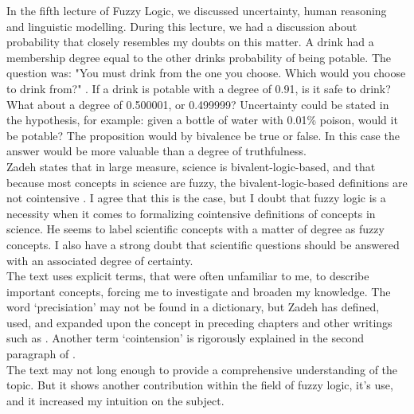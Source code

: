 In the fifth lecture of Fuzzy Logic, we discussed uncertainty, human reasoning and linguistic modelling. During this lecture, we had a discussion about probability that closely resembles my doubts on this matter. A drink had a membership degree equal to the other drinks probability of being potable. The question was: "You must drink from the one you choose. Which would you choose to drink from?" \cite[slide. 9]{lecture_5_uncertainty}. If a drink is potable with a degree of 0.91, is it safe to drink? What about a degree of 0.500001, or 0.499999? Uncertainty could be stated in the hypothesis, for example: given a bottle of water with 0.01\% poison, would it be potable? The proposition would by bivalence be true or false. In this case the answer would be more valuable than a degree of truthfulness. \\
Zadeh states that in large measure, science is bivalent-logic-based, and that because most concepts in science are fuzzy, the bivalent-logic-based definitions are not cointensive \cite[2769]{is_there_a_need_for_fuzzy_logic}. I agree that this is the case, but I doubt that fuzzy logic is a necessity when it comes to formalizing cointensive definitions of concepts in science. He seems to label scientific concepts with a matter of degree as fuzzy concepts. I also have a strong doubt that scientific questions should be answered with an associated degree of certainty. \\

The text uses explicit terms, that were often unfamiliar to me, to describe important concepts, forcing me to investigate and broaden my knowledge. The word `precisiation' may not be found in a dictionary, but Zadeh has defined, used, and expanded upon the concept in preceding chapters and other writings such as \cite{concept_of_cointensive_precisiation}. Another term `cointension' is rigorously explained in the second paragraph of \cite[2760]{is_there_a_need_for_fuzzy_logic}. \\

The text may not long enough to provide a comprehensive understanding of the topic. But it shows another contribution within the field of fuzzy logic, it's use, and it increased my intuition on the subject.
